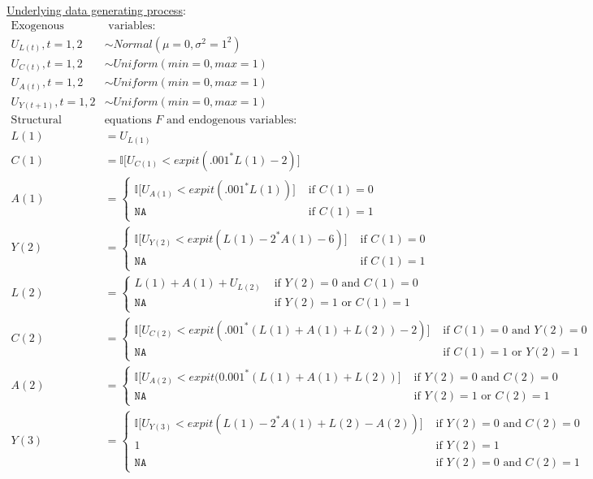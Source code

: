 \documentclass{exam}
\begin{document}
\underline{Underlying data generating process}:
\begin{align*}
\text{Exogenous} & \text{ variables:} \\
U_{L(t)}, t = 1, 2 &\sim Normal(\mu=0, \sigma^2=1^2) \\
U_{C(t)}, t = 1, 2 &\sim Uniform(min=0, max=1) \\
U_{A(t)}, t = 1, 2 &\sim Uniform(min=0, max=1) \\
U_{Y(t+1)}, t = 1, 2 &\sim Uniform(min=0, max=1) \\
\text{Structural } & \text{equations $F$ and endogenous variables:}  \\
L(1) &= U_{L(1)}  \\
C(1) &= \mathbb{I} \big[ U_{C(1)} < expit(.001^*L(1) - 2) \big] \\
A(1) & = 
    \begin{cases}
      \mathbb{I} \big[ U_{A(1)} < expit(.001^*L(1)) \big]  & \text{ if } C(1) = 0\ \\
      \texttt{NA} & \text{ if } C(1) = 1
    \end{cases} \\ 
Y(2) &= 
    \begin{cases}
      \mathbb{I} \big[U_{Y(2)} < expit(L(1) - 2^*A(1) - 6) \big] & \text{ if } C(1) = 0\ \\
      \texttt{NA} & \text{ if } C(1) = 1
      \end{cases} \\
L(2) &= 
    \begin{cases}
      L(1) + A(1) + U_{L(2)}  & \text{ if } Y(2) = 0 \text{ and } C(1) = 0\ \\
      \texttt{NA} & \text{ if } Y(2) = 1 \text{ or } C(1) = 1
    \end{cases} \\
C(2) &= 
  \begin{cases}
  \mathbb{I} \big[ U_{C(2)} < expit(.001^*(L(1) + A(1) + L(2)) - 2 ) \big] & \text{ if } C(1) = 0 \text{ and } Y(2) = 0\ \\
  \texttt{NA} & \text{ if } C(1) = 1 \text{ or } Y(2) = 1
  \end{cases} \\
A(2) &= 
    \begin{cases}
      \mathbb{I} \big[ U_{A(2)} < expit(0.001^*(L(1) + A(1) + L(2)) \big]  & \text{ if } Y(2) = 0 \text{ and } C(2) = 0\ \\
      \texttt{NA} & \text{ if } Y(2) = 1 \text{ or } C(2) = 1
    \end{cases} \\
Y(3) &=  
    \begin{cases}
      \mathbb{I} \big[ U_{Y(3)} < expit(L(1) - 2^*A(1) + L(2) - A(2) ) \big] & \text{ if } Y(2) = 0 \text{ and } C(2) = 0\ \\
      1 & \text{ if } Y(2) = 1\ \\
      \texttt{NA} & \text{ if } Y(2) = 0 \text{ and } C(2) = 1 
    \end{cases} \\
\end{align*}
\end{document}
